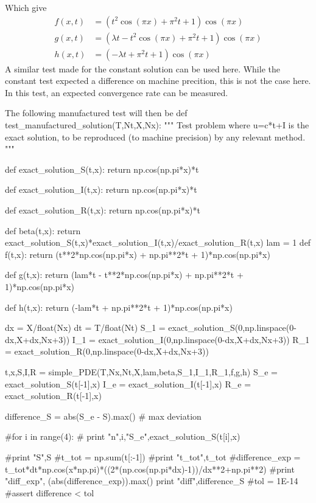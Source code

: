 \documentclass[%
twoside,                 %
final,                   %
10pt]{article}
\begin{document}
Which give
\begin{equation} \label{eq:manu_func}
	\begin{aligned}
	f(x,t) &= (t^2\cos(\pi x) + \pi^2t + 1)\cos(\pi x)\\
	g(x,t) &= (\lambda t - t^2\cos(\pi x) + \pi^2t + 1)\cos(\pi x)\\
	h(x,t) &= (-\lambda t + \pi^2t + 1)\cos(\pi x)
	\end{aligned}
\end{equation}
A similar test made for the constant solution can be used here. While the constant test expected a difference on machine precition, this is not the case here. In this test, an expected convergence rate can be measured.

The following manufactured test will then be
\bpycod
def test_manufactured_solution(T,Nt,X,Nx):
    """
    Test problem where u=c*t+I is the exact solution, to be
    reproduced (to machine precision) by any relevant method.
    """
    
    def exact_solution_S(t,x):
        return np.cos(np.pi*x)*t

    def exact_solution_I(t,x):
        return np.cos(np.pi*x)*t

    def exact_solution_R(t,x):
        return np.cos(np.pi*x)*t


    def beta(t,x):
        return exact_solution_S(t,x)*exact_solution_I(t,x)/exact_solution_R(t,x)
    lam = 1
    def f(t,x):
        return (t**2*np.cos(np.pi*x) + np.pi**2*t + 1)*np.cos(np.pi*x) 

    def g(t,x):
        return (lam*t - t**2*np.cos(np.pi*x) + np.pi**2*t + 1)*np.cos(np.pi*x)

    def h(t,x):
        return (-lam*t + np.pi**2*t + 1)*np.cos(np.pi*x)
        

    dx = X/float(Nx)
    dt = T/float(Nt)
    S_1 = exact_solution_S(0,np.linspace(0-dx,X+dx,Nx+3))
    I_1 = exact_solution_I(0,np.linspace(0-dx,X+dx,Nx+3))
    R_1 = exact_solution_R(0,np.linspace(0-dx,X+dx,Nx+3))
     
    t,x,S,I,R = simple_PDE(T,Nx,Nt,X,lam,beta,S_1,I_1,R_1,f,g,h)
    S_e = exact_solution_S(t[-1],x)
    I_e = exact_solution_I(t[-1],x)
    R_e = exact_solution_R(t[-1],x)
    
    difference_S = abs(S_e - S).max()  # max deviation

    
    #for i in range(4):
    #    print "n",i,"S_e",exact_solution_S(t[i],x)
    
    #print "S",S
    #t_tot = np.sum(t[:-1])
    #print "t_tot",t_tot
    #difference_exp = t_tot*dt*np.cos(x*np.pi)*((2*(np.cos(np.pi*dx)-1))/dx**2+np.pi**2)
    #print "diff_exp", (abs(difference_exp)).max()
    print "diff",difference_S
    #tol = 1E-14
    #assert difference < tol
    
\end{document}
